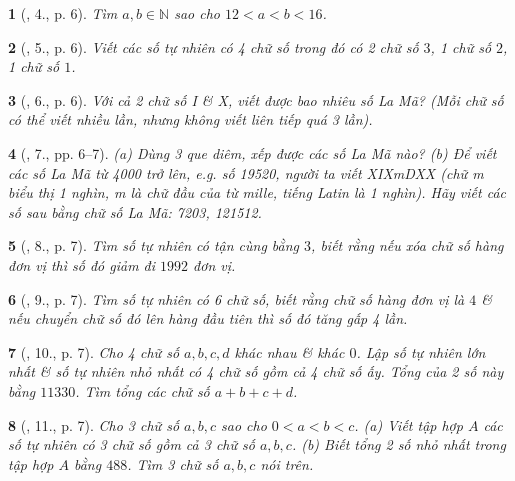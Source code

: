 \documentclass{article}
\newtheorem{baitoan}{}
\begin{document}
\begin{baitoan}[\cite{Binh_Toan_6_tap_1}, 4., p. 6]
	Tìm $a,b\in\mathbb{N}$ sao cho $12 < a < b < 16$.
\end{baitoan}

\begin{baitoan}[\cite{Binh_Toan_6_tap_1}, 5., p. 6]
	Viết các số tự nhiên có 4 chữ số trong đó có 2 chữ số $3$, 1 chữ số $2$, 1 chữ số $1$.
\end{baitoan}

\begin{baitoan}[\cite{Binh_Toan_6_tap_1}, 6., p. 6]
	Với cả 2 chữ số I \& X, viết được bao nhiêu số La Mã? (Mỗi chữ số có thể viết nhiều lần, nhưng không viết liên tiếp quá 3 lần).
\end{baitoan}

\begin{baitoan}[\cite{Binh_Toan_6_tap_1}, 7., pp. 6--7]
	(a) Dùng 3 que diêm, xếp được các số La Mã nào? (b) Để viết các số La Mã từ 4000 trở lên, e.g. số 19520, người ta viết XIXmDXX (chữ m biểu thị \emph{1 nghìn}, m là chữ đầu của từ \emph{mille}, tiếng Latin là 1 nghìn). Hãy viết các số sau bằng chữ số La Mã: 7203, 121512.
\end{baitoan}

\begin{baitoan}[\cite{Binh_Toan_6_tap_1}, 8., p. 7]
	Tìm số tự nhiên có tận cùng bằng $3$, biết rằng nếu xóa chữ số hàng đơn vị thì số đó giảm đi $1992$ đơn vị.
\end{baitoan}

\begin{baitoan}[\cite{Binh_Toan_6_tap_1}, 9., p. 7]
	Tìm số tự nhiên có 6 chữ số, biết rằng chữ số hàng đơn vị là $4$ \& nếu chuyển chữ số đó lên hàng đầu tiên thì số đó tăng gấp 4 lần.
\end{baitoan}

\begin{baitoan}[\cite{Binh_Toan_6_tap_1}, 10., p. 7]
	Cho 4 chữ số $a,b,c,d$ khác nhau \& khác $0$. Lập số tự nhiên lớn nhất \& số tự nhiên nhỏ nhất có 4 chữ số gồm cả 4 chữ số ấy. Tổng của 2 số này bằng $11330$. Tìm tổng các chữ số $a + b + c + d$.
\end{baitoan}

\begin{baitoan}[\cite{Binh_Toan_6_tap_1}, 11., p. 7]
	Cho 3 chữ số $a,b,c$ sao cho $0 < a < b < c$. (a) Viết tập hợp $A$ các số tự nhiên có 3 chữ số gồm cả 3 chữ số $a,b,c$. (b) Biết tổng 2 số nhỏ nhất trong tập hợp $A$ bằng $488$. Tìm 3 chữ số $a,b,c$ nói trên.
\end{baitoan}
\end{document}

